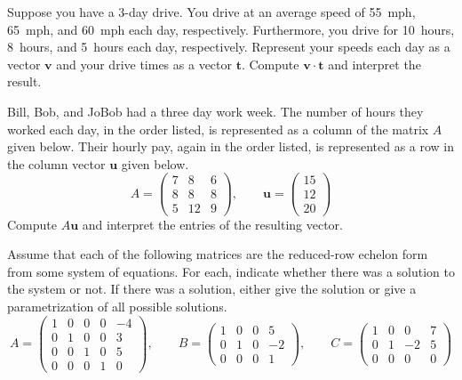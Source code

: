 \documentclass[11pt,letterpaper]{article}
\begin{document}

 Suppose you have a 3-day drive. You drive at an average speed of 55~mph, 65~mph, and 60~mph each day, respectively. Furthermore, you drive for 10~hours, 8~hours, and 5~hours each day, respectively. Represent your speeds each day as a vector $\mathbf{v}$ and your drive times as a vector $\mathbf{t}$. Compute $\mathbf{v} \cdot \mathbf{t}$ and interpret the result. 



\newpage



 Bill, Bob, and JoBob had a three day work week. The number of hours they worked each day, in the order listed, is represented as a column of the matrix $A$ given below. Their hourly pay, again in the order listed, is represented as a row in the column vector $\mathbf{u}$ given below. 
	\[
	A= \begin{pmatrix} 7 & 8 & 6 \\ 8 & 8 & 8 \\ 5 & 12 & 9 \end{pmatrix}, \qquad \mathbf{u}= \begin{pmatrix} 15 \\ 12 \\ 20 \end{pmatrix}
	\]
Compute $A\mathbf{u}$ and interpret the entries of the resulting vector.



\newpage



 Assume that each of the following matrices are the reduced-row echelon form from some system of equations. For each, indicate whether there was a solution to the system or not. If there was a solution, either give the solution or give a parametrization of all possible solutions. 
	\[
	A= \begin{pmatrix} 1 & 0 & 0 & 0 & -4 \\ 0 & 1 & 0 & 0 & 3 \\ 0 & 0 & 1 & 0 & 5 \\ 0 & 0 & 0 & 1 & 0  \end{pmatrix}, \qquad B= \begin{pmatrix} 1 & 0 & 0 & 5 \\ 0 & 1 & 0 & -2 \\ 0 & 0 & 0 & 1 \end{pmatrix}, \qquad C= \begin{pmatrix} 1 & 0 & 0 & 7 \\ 0 & 1 & -2 & 5 \\ 0 & 0 & 0 & 0 \end{pmatrix}
	\]
\end{document}
